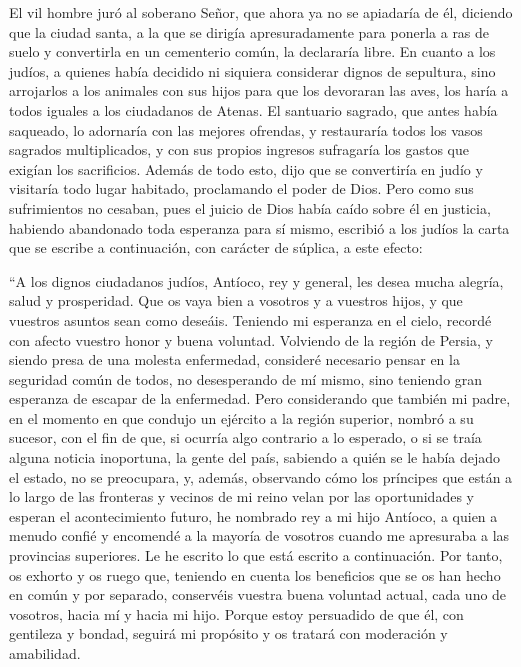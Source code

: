  El vil hombre juró al soberano Señor, que ahora ya no se
apiadaría de él, diciendo  que la ciudad santa, a la que
se dirigía apresuradamente para ponerla a ras de suelo y convertirla en
un cementerio común, la declararía libre.  En cuanto a
los judíos, a quienes había decidido ni siquiera considerar dignos de
sepultura, sino arrojarlos a los animales con sus hijos para que los
devoraran las aves, los haría a todos iguales a los ciudadanos de
Atenas.  El santuario sagrado, que antes había saqueado,
lo adornaría con las mejores ofrendas, y restauraría todos los vasos
sagrados multiplicados, y con sus propios ingresos sufragaría los gastos
que exigían los sacrificios.  Además de todo esto, dijo
que se convertiría en judío y visitaría todo lugar habitado, proclamando
el poder de Dios.  Pero como sus sufrimientos no cesaban,
pues el juicio de Dios había caído sobre él en justicia, habiendo
abandonado toda esperanza para sí mismo, escribió a los judíos la carta
que se escribe a continuación, con carácter de súplica, a este efecto:

 ``A los dignos ciudadanos judíos, Antíoco, rey y
general, les desea mucha alegría, salud y prosperidad. 
Que os vaya bien a vosotros y a vuestros hijos, y que vuestros asuntos
sean como deseáis. Teniendo mi esperanza en el cielo, 
recordé con afecto vuestro honor y buena voluntad. Volviendo de la
región de Persia, y siendo presa de una molesta enfermedad, consideré
necesario pensar en la seguridad común de todos,  no
desesperando de mí mismo, sino teniendo gran esperanza de escapar de la
enfermedad.  Pero considerando que también mi padre, en
el momento en que condujo un ejército a la región superior, nombró a su
sucesor,  con el fin de que, si ocurría algo contrario a
lo esperado, o si se traía alguna noticia inoportuna, la gente del país,
sabiendo a quién se le había dejado el estado, no se preocupara,
 y, además, observando cómo los príncipes que están a lo
largo de las fronteras y vecinos de mi reino velan por las oportunidades
y esperan el acontecimiento futuro, he nombrado rey a mi hijo Antíoco, a
quien a menudo confié y encomendé a la mayoría de vosotros cuando me
apresuraba a las provincias superiores. Le he escrito lo que está
escrito a continuación.  Por tanto, os exhorto y os ruego
que, teniendo en cuenta los beneficios que se os han hecho en común y
por separado, conservéis vuestra buena voluntad actual, cada uno de
vosotros, hacia mí y hacia mi hijo.  Porque estoy
persuadido de que él, con gentileza y bondad, seguirá mi propósito y os
tratará con moderación y amabilidad.

